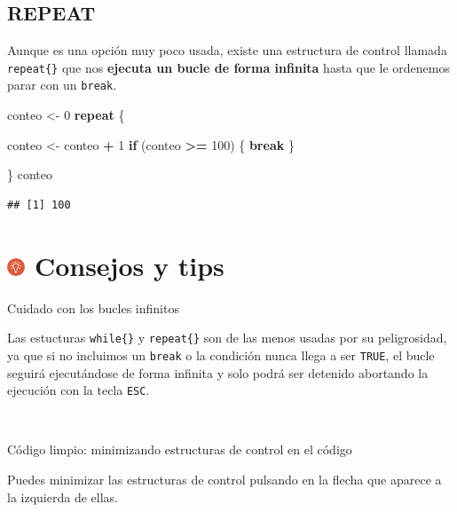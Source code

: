 \documentclass[11pt,]{book}
\newenvironment{Shaded}{\begin{snugshade}}{\end{snugshade}}
\newcommand{\ControlFlowTok}[1]{\textcolor[rgb]{0.27,0.27,0.27}{\textbf{#1}}}
\newcommand{\DecValTok}[1]{\textcolor[rgb]{0.06,0.06,0.06}{#1}}
\newcommand{\NormalTok}[1]{#1}
\newcommand{\OperatorTok}[1]{\textcolor[rgb]{0.43,0.43,0.43}{\textbf{#1}}}
\newcommand{\StringTok}[1]{\textcolor[rgb]{0.5,0.5,0.5}{#1}}
\begin{document}
\hypertarget{repeat}{%
\subsection{REPEAT}\label{repeat}}

Aunque es una opción muy poco usada, existe una estructura de control llamada \texttt{repeat\{\}} que nos \textbf{ejecuta un bucle de forma infinita} hasta que le ordenemos parar con un \texttt{break}.

\begin{Shaded}
\begin{Highlighting}[]
\NormalTok{conteo <-}\StringTok{ }\DecValTok{0}
\ControlFlowTok{repeat}\NormalTok{ \{ }
  
\NormalTok{  conteo <-}\StringTok{ }\NormalTok{conteo }\OperatorTok{+}\StringTok{ }\DecValTok{1}
  \ControlFlowTok{if}\NormalTok{ (conteo }\OperatorTok{>=}\StringTok{ }\DecValTok{100}\NormalTok{) \{ }\ControlFlowTok{break}\NormalTok{ \}}
  
\NormalTok{\}}
\NormalTok{conteo}
\end{Highlighting}
\end{Shaded}

\begin{verbatim}
## [1] 100
\end{verbatim}

\hypertarget{consejos-y-tips-6}{%
\section[ Consejos y tips]{\texorpdfstring{\protect\includegraphics[width=0.04\textwidth,height=\textheight]{img/logo_info.png} Consejos y tips}{ Consejos y tips}}\label{consejos-y-tips-6}}

Cuidado con los bucles infinitos

Las estucturas \texttt{while\{\}} y \texttt{repeat\{\}} son de las menos usadas por su peligrosidad, ya que si no incluimos un \texttt{break} o la condición nunca llega a ser \texttt{TRUE}, el bucle seguirá ejecutándose de forma infinita y solo podrá ser detenido abortando la ejecución con la tecla \texttt{ESC}.

~

Código limpio: minimizando estructuras de control en el código

Puedes minimizar las estructuras de control pulsando en la flecha que aparece a la izquierda de ellas.
\end{document}
